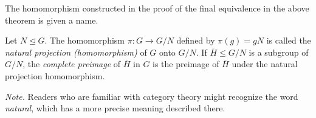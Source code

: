 The homomorphism constructed in the proof of the final equivalence in the above theorem is given a name.
\begin{definition}
    Let $N\unlhd G$. The homomorphism $\pi:G\to G/N$ defined by $\pi(g)=gN$ is called the \textit{natural projection (homomorphism)} of $G$ onto $G/N$. If $\overline H\leq G/N$ is a subgroup of $G/N$, the \textit{complete preimage} of $\overline H$ in $G$ is the preimage of $\overline H$ under the natural projection homomorphism.
\end{definition}

\textit{Note.} Readers who are familiar with category theory might recognize the word \textit{natural}, which has a more precise meaning described there.

\clearpage